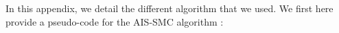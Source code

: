\documentclass[11pt]{article}
\begin{document}
In this appendix, we detail the different algorithm that we used. We first here provide a pseudo-code for the AIS-SMC algorithm : 

%		
%
%		
%
%
%		
%		
%		
%		
\end{document}
